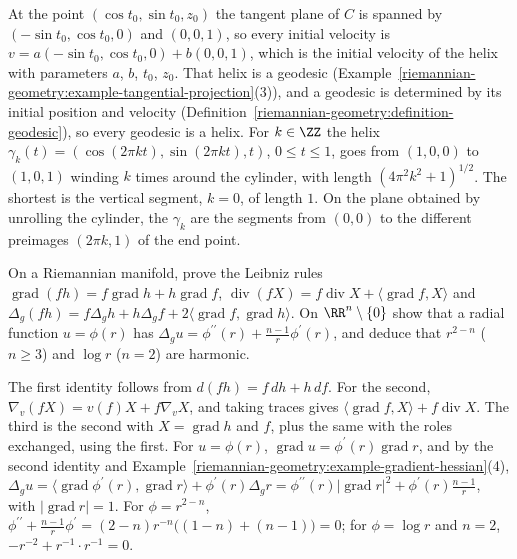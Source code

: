 \begin{solution}
At the point $(\cos t_0, \sin t_0, z_0)$ the tangent plane of $C$ is spanned by $(-\sin t_0, \cos t_0, 0)$ and $(0, 0, 1)$, so every initial velocity is $v = a(-\sin t_0, \cos t_0, 0) + b(0, 0, 1)$, which is the initial
velocity of the helix with parameters $a$, $b$, $t_0$, $z_0$. That helix is a geodesic (Example~\ref{riemannian-geometry:example-tangential-projection}(3)), and a geodesic is determined by its initial position and
velocity (Definition~\ref{riemannian-geometry:definition-geodesic}), so every geodesic is a helix. For $k \in \ZZ$ the helix $\gamma_k(t) = (\cos(2\pi kt), \sin(2\pi kt), t)$, $0 \leq t \leq 1$, goes from $(1, 0, 0)$
to $(1, 0, 1)$ winding $k$ times around the cylinder, with length $(4\pi^2k^2 + 1)^{1/2}$. The shortest is the vertical segment, $k = 0$, of length $1$. On the plane obtained by unrolling the cylinder,
the $\gamma_k$ are the segments from $(0, 0)$ to the different preimages $(2\pi k, 1)$ of the end point.
\end{solution}

\begin{exercise}\label{riemannian-geometry:exercise-gradient-identities}
On a Riemannian manifold, prove the Leibniz rules $\operatorname{grad}(fh) = f\operatorname{grad}h + h\operatorname{grad}f$, $\operatorname{div}(fX) = f\operatorname{div}X + \langle\operatorname{grad}f, X\rangle$ and
$\Delta_g(fh) = f\Delta_gh + h\Delta_gf + 2\langle\operatorname{grad}f, \operatorname{grad}h\rangle$. On $\RR^n \setminus \{0\}$ show that a radial function $u = \phi(r)$ has $\Delta_gu = \phi^{\prime\prime}(r) + \frac{n-1}{r}\phi^{\prime}(r)$, and
deduce that $r^{2-n}$ ($n \geq 3$) and $\log r$ ($n = 2$) are harmonic.
\end{exercise}

\begin{solution}
The first identity follows from $d(fh) = f\,dh + h\,df$. For the second, $\nabla_v(fX) = v(f)X + f\nabla_vX$, and taking traces gives $\langle\operatorname{grad}f, X\rangle + f\operatorname{div}X$. The third is the second with
$X = \operatorname{grad}h$ and $f$, plus the same with the roles exchanged, using the first. For $u = \phi(r)$, $\operatorname{grad}u = \phi^{\prime}(r)\operatorname{grad}r$, and by the second identity and
Example~\ref{riemannian-geometry:example-gradient-hessian}(4), $\Delta_gu = \langle\operatorname{grad}\phi^{\prime}(r), \operatorname{grad}r\rangle + \phi^{\prime}(r)\Delta_gr = \phi^{\prime\prime}(r)|\operatorname{grad}r|^2 + \phi^{\prime}(r)\frac{n-1}{r}$,
with $|\operatorname{grad}r| = 1$. For $\phi = r^{2-n}$, $\phi^{\prime\prime} + \frac{n-1}{r}\phi^{\prime} = (2-n)r^{-n}\bigl((1-n) + (n-1)\bigr) = 0$; for $\phi = \log r$ and $n = 2$, $-r^{-2} + r^{-1} \cdot r^{-1} = 0$.
\end{solution}

